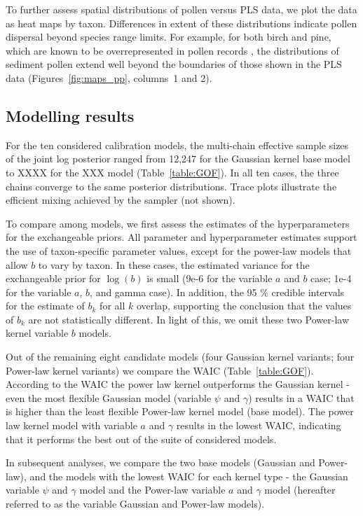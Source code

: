 \documentclass[12pt]{article}
\begin{document}
To further assess spatial distributions of pollen versus PLS data, we
plot the data as heat maps by taxon. Differences in extent of these
distributions indicate pollen dispersal beyond species range
limits. For example, for both birch and pine, which are known to be
overrepresented in pollen records \citep{williams2003palynological},
the distributions of sediment pollen extend well beyond the boundaries
of those shown in the PLS data (Figures~\ref{fig:maps_pp}, columns~1
and 2).

\subsection{Modelling results}

For the ten considered calibration models, the multi-chain effective
sample sizes of the joint log posterior ranged from 12,247 for the
Gaussian kernel base model to XXXX for the XXX model
(Table~\ref{table:GOF}). In all ten cases, the three chains converge
to the same posterior distributions. Trace plots illustrate the
efficient mixing achieved by the sampler (not shown).

To compare among models, we first assess the estimates of the
hyperparameters for the exchangeable priors. All parameter and
hyperparameter estimates support the use of taxon-specific parameter
values, except for the power-law models that allow $b$ to vary by
taxon. In these cases, the estimated variance for the exchangeable
prior for $\log ( b )$ is small (9e-6 for the variable $a$ and $b$
case; 1e-4 for the variable $a$, $b$, and gamma case). In addition,
the 95 \% credible intervals for the estimate of $b_k$ for all $k$
overlap, supporting the conclusion that the values of $b_k$ are not
statistically different. In light of this, we omit these two
Power-law kernel variable $b$ models.

Out of the remaining eight candidate models (four Gaussian kernel
variants; four Power-law kernel variants) we compare the WAIC
(Table~\ref{table:GOF}). According to the WAIC the power law kernel
outperforms the Gaussian kernel - even the most flexible Gaussian
model (variable $\psi$ and $\gamma$) results in a WAIC that is higher
than the least flexible Power-law kernel model (base model). The power
law kernel model with variable $a$ and $\gamma$ results in the lowest
WAIC, indicating that it performs the best out of the suite of
considered models. 

In subsequent analyses, we compare the two base models (Gaussian and
Power-law), and the models with the lowest WAIC for each kernel type -
the Gaussian variable $\psi$ and $\gamma$ model and the Power-law
variable $a$ and $\gamma$ model (hereafter referred to as the variable
Gaussian and Power-law models).
\end{document}
